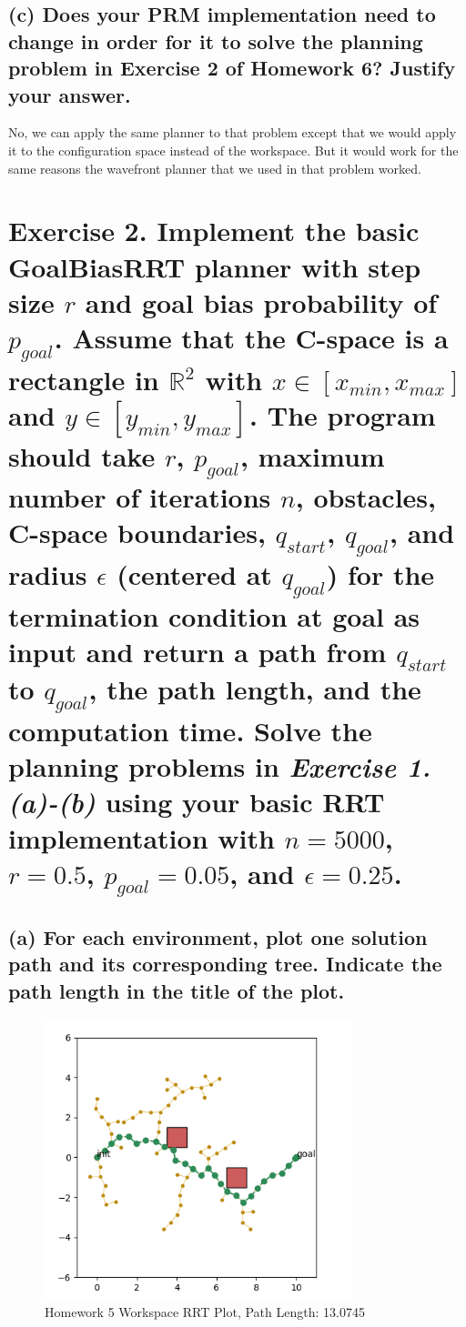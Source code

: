 \documentclass{article}
\begin{document}
\subsection*{(c) Does your PRM implementation need to change in order for it to solve the planning problem in Exercise 2 of Homework 6? Justify your answer.}

No, we can apply the same planner to that problem except that we would apply it to the configuration space instead of the workspace. But it would work for the same reasons the wavefront planner that we used in that problem worked.

\section*{Exercise 2.
Implement the basic GoalBiasRRT planner with step size \(r\) and goal bias probability of \(p_{goal}\). Assume that the C-space is a rectangle in \(\mathbb{R}^2\) with \(x \in [x_{min}, x_{max}]\) and \(y \in [y_{min}, y_{max}]\). The program should take \(r\), \(p_{goal}\), maximum number of iterations \(n\), obstacles, C-space boundaries, \(q_{start}\), \(q_{goal}\), and radius \(\epsilon\) (centered at \(q_{goal}\)) for the termination condition at goal as input and return a path from \(q_{start}\) to \(q_{goal}\), the path length, and the computation time.
Solve the planning problems in \textit{Exercise 1.(a)-(b)} using your basic RRT implementation with \(n = 5000\), \(r = 0.5\), \(p_{goal} = 0.05\), and \(\epsilon = 0.25\).
}

\subsection*{(a)
For each environment, plot one solution path and its corresponding tree. Indicate the path length in the title of the plot.
}

\begin{figure}[h]
    \centering
    \includegraphics[width=0.8\textwidth]{e2aHW5plot.png}
    \caption{Homework 5 Workspace RRT Plot, Path Length: 13.0745}
    \label{fig:e2aHW5plot}
\end{figure}
\end{document}
